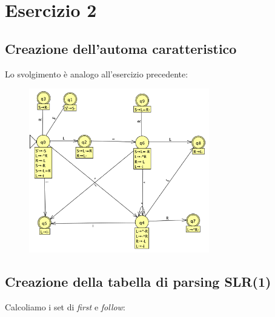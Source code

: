 \documentclass[11pt]{article}
\begin{document}
\newpage

\section{Esercizio 2}
\subsection{Creazione dell'automa caratteristico}
Lo svolgimento è analogo all'esercizio precedente:

\begin{figure}[H]
  \centering
  \includegraphics[width=0.7\textwidth]{img/02AutomaSRL.png}
  \label{fig:02-automa}
\end{figure}

\subsection{Creazione della tabella di parsing SLR(1)}
Calcoliamo i set di \textit{first} e \textit{follow}:
\end{document}
